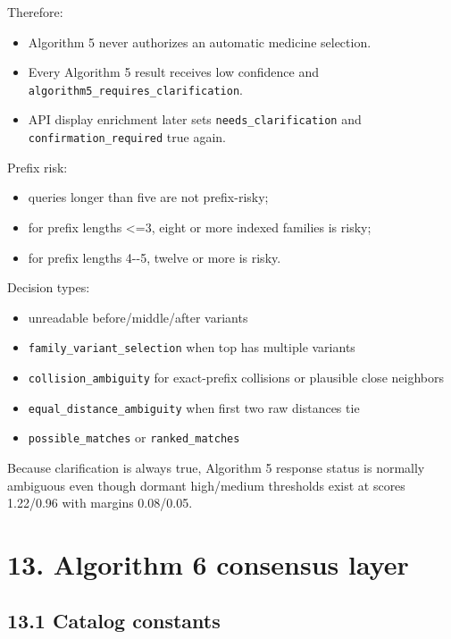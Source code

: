 Therefore:

\begin{itemize}
\tightlist
\item
  Algorithm 5 never authorizes an automatic medicine selection.
\item
  Every Algorithm 5 result receives low confidence and \texttt{algorithm5\_\allowbreak{}requires\_\allowbreak{}clarification}.
\item
  API display enrichment later sets \texttt{needs\_\allowbreak{}clarification} and \texttt{confirmation\_\allowbreak{}required} true again.
\end{itemize}

Prefix risk:

\begin{itemize}
\tightlist
\item
  queries longer than five are not prefix-risky;
\item
  for prefix lengths \textless=3, eight or more indexed families is risky;
\item
  for prefix lengths 4-\/-5, twelve or more is risky.
\end{itemize}

Decision types:

\begin{itemize}
\tightlist
\item
  unreadable before/middle/after variants
\item
  \texttt{family\_\allowbreak{}variant\_\allowbreak{}selection} when top has multiple variants
\item
  \texttt{collision\_\allowbreak{}ambiguity} for exact-prefix collisions or plausible close neighbors
\item
  \texttt{equal\_\allowbreak{}distance\_\allowbreak{}ambiguity} when first two raw distances tie
\item
  \texttt{possible\_\allowbreak{}matches} or \texttt{ranked\_\allowbreak{}matches}
\end{itemize}

Because clarification is always true, Algorithm 5 response status is normally ambiguous even though dormant high/medium thresholds exist at scores 1.22/0.96 with margins 0.08/0.05.

\section{13. Algorithm 6 consensus layer}\label{13-algorithm-6-consensus-layer}

\subsection{13.1 Catalog constants}\label{131-catalog-constants}

